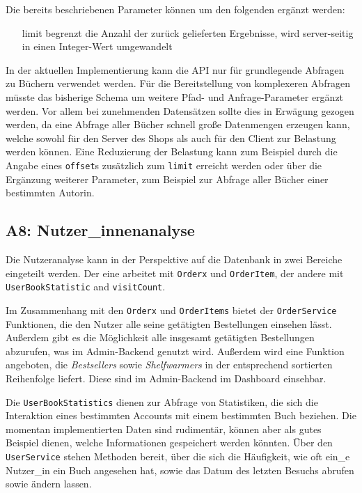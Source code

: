 	Die bereits beschriebenen Parameter können um den folgenden ergänzt werden:
	\begin{itemize}
		\item[limit] begrenzt die Anzahl der zurück gelieferten Ergebnisse, wird server-seitig in einen Integer-Wert umgewandelt
	\end{itemize}
	
	In der aktuellen Implementierung kann die API nur für grundlegende Abfragen zu Büchern verwendet werden. Für die Bereitstellung von komplexeren Abfragen müsste das bisherige Schema um weitere Pfad- und Anfrage-Parameter ergänzt werden. Vor allem bei zunehmenden Datensätzen sollte dies in Erwägung gezogen werden, da eine Abfrage aller Bücher schnell große Datenmengen erzeugen kann, welche sowohl für den Server des Shops als auch für den Client zur Belastung werden können. Eine Reduzierung der Belastung kann zum Beispiel durch die Angabe eines \lstinline|offset|s zusätzlich zum \lstinline|limit| erreicht werden oder über die Ergänzung weiterer Parameter, zum Beispiel zur Abfrage aller Bücher einer bestimmten Autorin.
	
	\subsection{A8: Nutzer\_innenanalyse}\label{sec:umsetzung:analyse}
	Die Nutzeranalyse kann in der Perspektive auf die Datenbank in zwei Bereiche eingeteilt werden. Der eine arbeitet mit \texttt{Orderx} und \texttt{OrderItem}, der andere mit \texttt{User\-Book\-Statistic} and \texttt{visitCount}.
	
	Im Zusammenhang mit den \texttt{Orderx} und \texttt{OrderItems} bietet der \texttt{OrderService} Funktionen, die den Nutzer alle seine getätigten Bestellungen einsehen lässt. Außerdem gibt es die Möglichkeit alle insgesamt getätigten Bestellungen abzurufen, was im Admin-Backend genutzt wird. Außerdem wird eine Funktion angeboten, die \textit{Bestsellers} sowie \textit{Shelfwarmers} in der entsprechend sortierten Reihenfolge liefert. Diese sind im Admin-Backend im Dashboard einsehbar.
	
	Die \texttt{UserBookStatistics} dienen zur Abfrage von Statistiken, die sich die Interaktion eines bestimmten Accounts mit einem bestimmten Buch beziehen. Die momentan implementierten Daten sind rudimentär, können aber als gutes Beispiel dienen, welche Informationen gespeichert werden könnten. Über den \texttt{UserService} stehen Methoden bereit, über die sich die Häufigkeit, wie oft ein\_e Nutzer\_in ein Buch angesehen hat, sowie das Datum des letzten Besuchs abrufen sowie ändern lassen.
	

